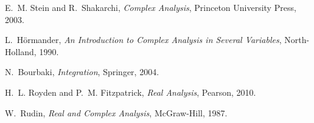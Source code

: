 \documentclass[11pt,a4paper]{article}
\theoremstyle{remark}
\begin{document}
\begin{thebibliography}{9}

E.~M. Stein and R.~Shakarchi, \emph{Complex Analysis}, Princeton University Press, 2003.

L.~H\"ormander, \emph{An Introduction to Complex Analysis in Several Variables}, North-Holland, 1990.

N.~Bourbaki, \emph{Integration}, Springer, 2004.

H.~L. Royden and P.~M. Fitzpatrick, \emph{Real Analysis}, Pearson, 2010.

W.~Rudin, \emph{Real and Complex Analysis}, McGraw-Hill, 1987.

\end{thebibliography}
\end{document}
